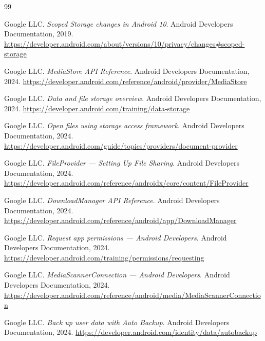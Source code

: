 ﻿\documentclass[12pt, a4paper]{article}
\begin{document}
\begin{thebibliography}{99}

Google LLC.
\newblock \emph{Scoped Storage changes in Android 10}.
\newblock Android Developers Documentation, 2019.
\newblock \url{https://developer.android.com/about/versions/10/privacy/changes#scoped-storage}

Google LLC.
\newblock \emph{MediaStore API Reference}.
\newblock Android Developers Documentation, 2024.
\newblock \url{https://developer.android.com/reference/android/provider/MediaStore}

Google LLC.
\newblock \emph{Data and file storage overview}.
\newblock Android Developers Documentation, 2024.
\newblock \url{https://developer.android.com/training/data-storage}

Google LLC.
\newblock \emph{Open files using storage access framework}.
\newblock Android Developers Documentation, 2024.
\newblock \url{https://developer.android.com/guide/topics/providers/document-provider}

Google LLC.
\newblock \emph{FileProvider --- Setting Up File Sharing}.
\newblock Android Developers Documentation, 2024.
\newblock \url{https://developer.android.com/reference/androidx/core/content/FileProvider}

Google LLC.
\newblock \emph{DownloadManager API Reference}.
\newblock Android Developers Documentation, 2024.
\newblock \url{https://developer.android.com/reference/android/app/DownloadManager}

Google LLC.
\newblock \emph{Request app permissions --- Android Developers}.
\newblock Android Developers Documentation, 2024.
\newblock \url{https://developer.android.com/training/permissions/requesting}

Google LLC.
\newblock \emph{MediaScannerConnection --- Android Developers}.
\newblock Android Developers Documentation, 2024.
\newblock \url{https://developer.android.com/reference/android/media/MediaScannerConnection}

Google LLC.
\newblock \emph{Back up user data with Auto Backup}.
\newblock Android Developers Documentation, 2024.
\newblock \url{https://developer.android.com/identity/data/autobackup}


\end{thebibliography}
\end{document}
